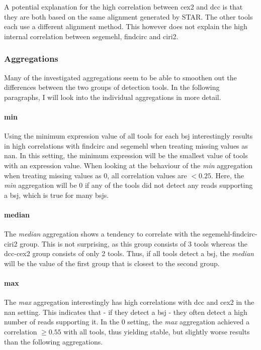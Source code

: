 A potential explanation for the high correlation between \gls{cex2} and
\gls{dcc} is that they are both based on the same alignment generated by
STAR\supercite{dobin_star_2013}.
The other tools each use a different alignment method.
This however does not explain the high internal correlation between
\gls{segemehl}, \gls{findcirc} and \gls{ciri2}.

\subsubsection{Aggregations}
Many of the investigated aggregations seem to be able to smoothen out the
differences between the two groups of detection tools.
In the following paragraphs, I will look into the individual aggregations in
more detail.

\paragraph{min}
Using the minimum expression value of all tools for each \gls{bsj}
interestingly results in high correlations with \gls{findcirc} and
\gls{segemehl} when treating missing values as \gls{nan}.
In this setting, the minimum expression will be the smallest value of tools
with an expression value.
When looking at the behaviour of the \textit{min} aggregation when treating missing
values as 0, all correlation values are $<0.25$.
Here, the \textit{min} aggregation will be 0 if any of the tools did not detect any
reads supporting a \gls{bsj}, which is true for many \glspl{bsj}.

\paragraph{median}
The \textit{median} aggregation shows a tendency to correlate with the
\gls{segemehl}-\gls{findcirc}-\gls{ciri2} group.
This is not surprising, as this group consists of 3 tools whereas the
\gls{dcc}-\gls{cex2} group consists of only 2 tools.
Thus, if all tools detect a \gls{bsj}, the \textit{median} will be the value of the
first group that is closest to the second group.

\paragraph{max}
The \textit{max} aggregation interestingly has high correlations with \gls{dcc} and
\gls{cex2} in the \gls{nan} setting.
This indicates that - if they detect a \gls{bsj} - they often detect a high
number of reads supporting it.
In the 0 setting, the \textit{max} aggregation achieved a correlation $\geq 0.55$ with
all tools, thus yielding stable, but slightly worse results than the following
aggregations.

